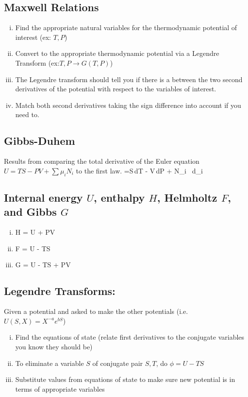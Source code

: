 \documentclass[12pt]{article}
\begin{document}
\subsection{Maxwell Relations}
\begin{enumerate}[(i)]
\item Find the appropriate natural variables for the thermodynamic potential of interest (ex: $T,P$)
\item Convert to the appropriate thermodynamic potential via a Legendre Transform (ex:$T,P \rightarrow G(T,P)$)
\item The Legendre transform should tell you if there is a  between the two second derivatives of the potential with respect to the variables of interest.
\item Match both second derivatives taking the sign difference into account if you need to.
\end{enumerate}
\subsection{Gibbs-Duhem}
Results from comparing the total derivative of the Euler equation $U = TS - PV + \sum\mu_i N_i$ to the first law.
=S\,dT - V\,dP + \sum N_i \, d\mu_i
\eqe
\subsection{Internal energy $U$, enthalpy $H$, Helmholtz $F$, and Gibbs $G$}
\begin{enumerate}[(i)]
\item H = U + PV
\item F = U - TS
\item G = U - TS + PV
\end{enumerate}
\subsection{Legendre Transforms:}
Given a potential and asked to make the other potentials (i.e. $U(S,X) = X^{-a}e^{bS}$)
\begin{enumerate}[(i)]
\item Find the equations of state (relate first derivatives to the conjugate variables you know they should be)
\item To eliminate a variable $S$ of conjugate pair $S,T$, do $\phi= U-TS$
\item Substitute values from equations of state to make sure new potential is in terms of appropriate variables
\end{enumerate}
%
\end{document}
